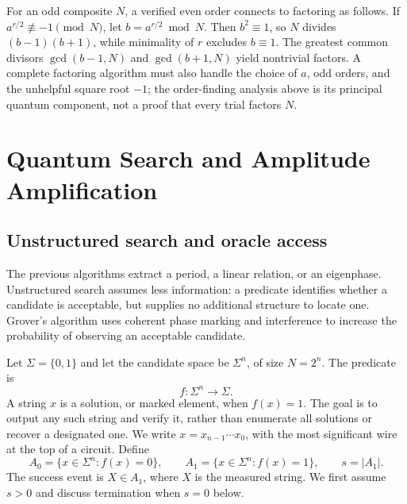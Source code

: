 \documentclass[11pt,oneside,openany]{book}
\theoremstyle{definition}
\begin{document}
For an odd composite $N$, a verified even order connects to factoring as follows. If $a^{r/2}\not\equiv-1\pmod N$, let $b=a^{r/2}\bmod N$. Then $b^2\equiv1$, so $N$ divides $(b-1)(b+1)$, while minimality of $r$ excludes $b\equiv1$. The greatest common divisors $\gcd(b-1,N)$ and $\gcd(b+1,N)$ yield nontrivial factors. A complete factoring algorithm must also handle the choice of $a$, odd orders, and the unhelpful square root $-1$; the order-finding analysis above is its principal quantum component, not a proof that every trial factors $N$.


\chapter{Quantum Search and Amplitude Amplification}
\label{ch:search}

\section{Unstructured search and oracle access}

The previous algorithms extract a period, a linear relation, or an eigenphase. Unstructured search assumes less information: a predicate identifies whether a candidate is acceptable, but supplies no additional structure to locate one. Grover's algorithm uses coherent phase marking and interference to increase the probability of observing an acceptable candidate\cite{Grover1996,NC2010}.

Let $\Sigma=\{0,1\}$ and let the candidate space be $\Sigma^n$, of size $N=2^n$. The predicate is
\begin{equation}
 f:\Sigma^n\longrightarrow\Sigma.
 \label{eq:search-predicate}
\end{equation}
A string $x$ is a solution, or marked element, when $f(x)=1$. The goal is to output any such string and verify it, rather than enumerate all solutions or recover a designated one. We write $x=x_{n-1}\cdots x_0$, with the most significant wire at the top of a circuit. Define
\begin{equation}
 A_0=\{x\in\Sigma^n:f(x)=0\},\qquad
 A_1=\{x\in\Sigma^n:f(x)=1\},\qquad s=|A_1|.
 \label{eq:search-sets}
\end{equation}
The success event is $X\in A_1$, where $X$ is the measured string. We first assume $s>0$ and discuss termination when $s=0$ below.
\end{document}
